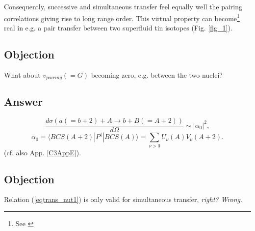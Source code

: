 Consequently, successive and simultaneous transfer feel equally well the pairing correlations giving rise to long range order. This virtual property can become\footnote{See \cite{Oertzen:13}} real in e.g. a pair transfer between two superfluid tin isotopes (Fig. \ref{fig_1}).
\subsection*{Objection}
What about $v_{pairing}(=G)$ becoming zero, e.g. between the two nuclei?
\subsection*{Answer}
\begin{equation}
\frac{d\sigma(a(=b+2)+A\rightarrow b+B(=A+2))}{d\Omega}\sim |\alpha_0|^2,
\end{equation}
\begin{equation}\label{eqtrans_nut1}
\alpha_0=\langle BCS(A+2) |P^\dagger|BCS(A)\rangle=\sum_{\nu>0}U_{\nu}(A)V_{\nu}(A+2).
\end{equation}
(cf. also App. \ref{C3AppE}).
\subsection*{Objection}
Relation (\ref{eqtrans_nut1}) is only valid for simultaneous transfer, \textit{right?} \textit{Wrong}.
